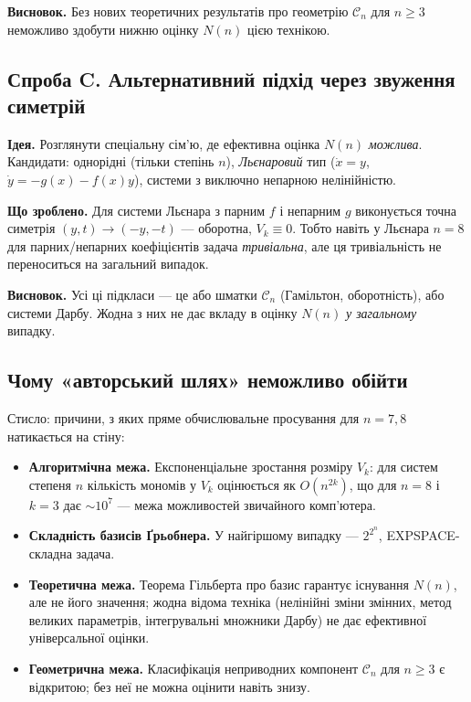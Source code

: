 \documentclass[12pt,a4paper]{article}
\begin{document}
\textbf{Висновок.} Без нових теоретичних результатів про геометрію $\mathcal{C}_n$ для $n\geq 3$ неможливо здобути нижню оцінку $N(n)$ цією технікою.

\subsection*{Спроба C. Альтернативний підхід через звуження симетрій}

\textbf{Ідея.} Розглянути спеціальну сім'ю, де ефективна оцінка $N(n)$ \emph{можлива}. Кандидати: однорідні (тільки степінь $n$), \emph{Льєнаровий} тип ($\dot x = y$, $\dot y = -g(x) - f(x)y$), системи з виключно непарною нелінійністю.

\textbf{Що зроблено.} Для системи Льєнара з парним $f$ і непарним $g$ виконується точна симетрія $(y,t)\to(-y,-t)$ --- оборотна, $V_k\equiv 0$. Тобто навіть у Льєнара $n=8$ для парних/непарних коефіцієнтів задача \emph{тривіальна}, але ця тривіальність не переноситься на загальний випадок.

\textbf{Висновок.} Усі ці підкласи --- це або шматки $\mathcal{C}_n$ (Гамільтон, оборотність), або системи Дарбу. Жодна з них не дає вкладу в оцінку $N(n)$ \emph{у загальному} випадку.

\subsection*{Чому «авторський шлях» неможливо обійти}

Стисло: причини, з яких пряме обчислювальне просування для $n=7,8$ натикається на стіну:

\begin{itemize}
  \item \textbf{Алгоритмічна межа.} Експоненціальне зростання розміру $V_k$: для систем степеня $n$ кількість мономів у $V_k$ оцінюється як $O(n^{2k})$, що для $n=8$ і $k=3$ дає $\sim 10^7$ --- межа можливостей звичайного комп'ютера.
  \item \textbf{Складність базисів Ґрьобнера.} У найгіршому випадку --- $2^{2^n}$, EXPSPACE-складна задача.
  \item \textbf{Теоретична межа.} Теорема Гільберта про базис гарантує існування $N(n)$, але не його значення; жодна відома техніка (нелінійні зміни змінних, метод великих параметрів, інтегрувальні множники Дарбу) не дає ефективної універсальної оцінки.
  \item \textbf{Геометрична межа.} Класифікація неприводних компонент $\mathcal{C}_n$ для $n\geq 3$ є відкритою; без неї не можна оцінити навіть знизу.
\end{itemize}
\end{document}
